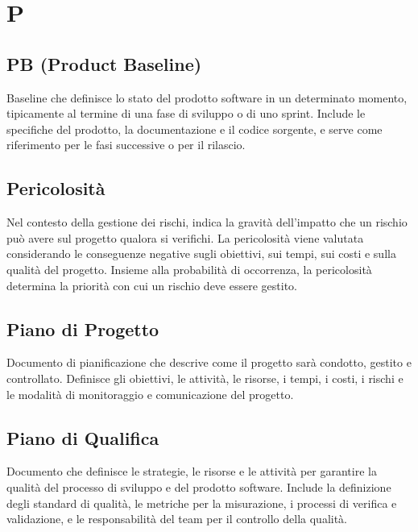 \documentclass[a4paper,11pt]{article}
\begin{document}
\newpage









\section{P}

\subsection{PB (Product Baseline)}
Baseline che definisce lo stato del prodotto software in un determinato momento, tipicamente al termine di una fase di sviluppo o di uno sprint. Include le specifiche del prodotto, la documentazione e il codice sorgente, e serve come riferimento per le fasi successive o per il rilascio.






\subsection{Pericolosità}
Nel contesto della gestione dei rischi, indica la gravità dell'impatto che un rischio può avere sul progetto qualora si verifichi. La pericolosità viene valutata considerando le conseguenze negative sugli obiettivi, sui tempi, sui costi e sulla qualità del progetto. Insieme alla probabilità di occorrenza, la pericolosità determina la priorità con cui un rischio deve essere gestito.









\subsection{Piano di Progetto}
Documento di pianificazione che descrive come il progetto sarà condotto, gestito e controllato. Definisce gli obiettivi, le attività, le risorse, i tempi, i costi, i rischi e le modalità di monitoraggio e comunicazione del progetto.









\subsection{Piano di Qualifica}
Documento che definisce le strategie, le risorse e le attività per garantire la qualità del processo di sviluppo e del prodotto software. Include la definizione degli standard di qualità, le metriche per la misurazione, i processi di verifica e validazione, e le responsabilità del team per il controllo della qualità.
\end{document}
